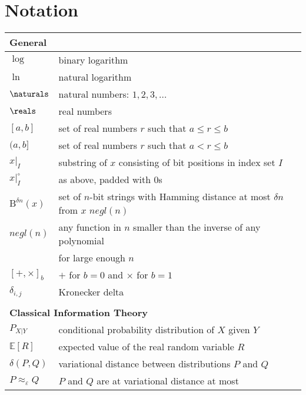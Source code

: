 \documentclass[final,11pt,a4paper]{report}
\newcommand*{\clearemptydoublepage}{\newpage{\pagestyle{empty}\cleardoublepage}}
\newcommand*{\negl}[1]{\mathit{negl}({#1})}
\newcommand*{\pad}{|^{\circ}}          %
\newcommand*{\ball}[1]{{\mathrm{B}}^{#1}}  %
\newcommand*{\eps}{\varepsilon}
\newcommand*{\E}{\mathbb{E}}   %
\begin{document}

\clearemptydoublepage
{}
{}
\chapter*{{\Huge Notation}}

\begin{tabular}{ll}
\multicolumn{2}{l}{\bf General}  \\ \hline
$\log$ & binary logarithm \index{log@$\log(\cdot)$} \\
$\ln$  & natural logarithm \index{ln@$\ln(\cdot)$} \\
$\naturals$ & natural numbers: $1,2,3,\ldots$ \\
$\reals$   & real numbers \\
$[a,b]$ & set of real numbers $r$ such that $a \leq r \leq b$ \index{interval}\\
$(a,b]$ & set of real numbers $r$ such that $a < r \leq b$\\
$x|_I$  & substring of $x$ consisting of bit positions in index set
$I$ \index{substring}\\
$x\pad_I$ & as above, padded with $0$s \\
$\ball{\delta n}(x)$ & set of $n$-bit strings with Hamming distance at
most $\delta n$ from $x$ \index{negl@$\negl{n}$}$\negl{n}$\\
$\negl{n}$ & any function in $n$ smaller than the inverse of any
polynomial\\
& for large enough $n$  \\
$[+, \times]_b$ & $+$ for $b=0$ and $\times$ for $b=1$\\
$\delta_{i,j}$ & \index{Kronecker delta}Kronecker delta\\ \hline
\\
\multicolumn{2}{l}{\bf Classical Information Theory} \\ \hline
$P_{X|Y}$ & conditional probability distribution of $X$ given $Y$ \\
$\E[R]$ & expected value of the real random variable $R$
\index{expected value}\\
$\delta(P,Q)$ & variational distance between distributions $P$ and
$Q$ \index{variational distance}\\
$P \approx_\eps Q$ & $P$ and $Q$ are at variational distance at most

\end{tabular}
\end{document}
